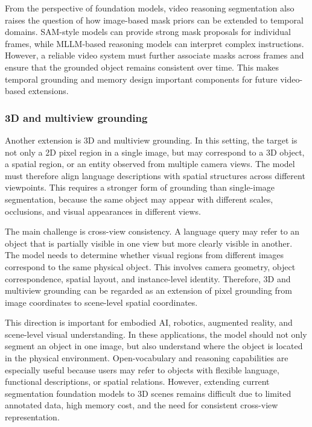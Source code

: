 From the perspective of foundation models, video reasoning segmentation also raises the question of how image-based mask priors can be extended to temporal domains. 
SAM-style models can provide strong mask proposals for individual frames, while MLLM-based reasoning models can interpret complex instructions. 
However, a reliable video system must further associate masks across frames and ensure that the grounded object remains consistent over time. 
This makes temporal grounding and memory design important components for future video-based extensions.

\subsubsection{3D and multiview grounding}

Another extension is 3D and multiview grounding. 
In this setting, the target is not only a 2D pixel region in a single image, but may correspond to a 3D object, a spatial region, or an entity observed from multiple camera views. 
The model must therefore align language descriptions with spatial structures across different viewpoints. 
This requires a stronger form of grounding than single-image segmentation, because the same object may appear with different scales, occlusions, and visual appearances in different views.

The main challenge is cross-view consistency. 
A language query may refer to an object that is partially visible in one view but more clearly visible in another. 
The model needs to determine whether visual regions from different images correspond to the same physical object. 
This involves camera geometry, object correspondence, spatial layout, and instance-level identity. 
Therefore, 3D and multiview grounding can be regarded as an extension of pixel grounding from image coordinates to scene-level spatial coordinates.

This direction is important for embodied AI, robotics, augmented reality, and scene-level visual understanding. 
In these applications, the model should not only segment an object in one image, but also understand where the object is located in the physical environment. 
Open-vocabulary and reasoning capabilities are especially useful because users may refer to objects with flexible language, functional descriptions, or spatial relations. 
However, extending current segmentation foundation models to 3D scenes remains difficult due to limited annotated data, high memory cost, and the need for consistent cross-view representation.


